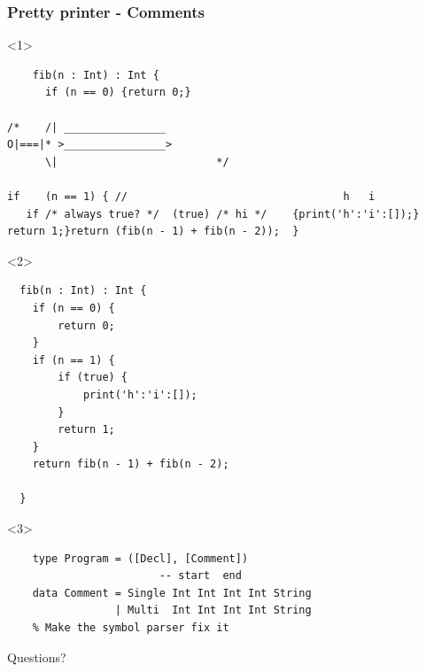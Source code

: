 \documentclass{beamer}
\begin{document}
\begin{frame}[fragile]
  \frametitle{Pretty printer - Comments}
    \begin{onlyenv}<1>
  \begin{verbatim}
    fib(n : Int) : Int {
      if (n == 0) {return 0;}
    
/*    /| ________________
O|===|* >________________>
      \|                         */

if    (n == 1) { //                                  h   i 
   if /* always true? */  (true) /* hi */    {print('h':'i':[]);}
return 1;}return (fib(n - 1) + fib(n - 2));  }
    \end{verbatim}
  \end{onlyenv}
\begin{onlyenv}<2>
  \begin{verbatim}
  fib(n : Int) : Int {
    if (n == 0) {
        return 0;
    }
    if (n == 1) {
        if (true) {
            print('h':'i':[]);
        }
        return 1;
    }
    return fib(n - 1) + fib(n - 2);

  }
    \end{verbatim}
  \end{onlyenv}

  \begin{onlyenv}<3>
  \begin{verbatim}
    type Program = ([Decl], [Comment])
                        -- start  end 
    data Comment = Single Int Int Int Int String
                 | Multi  Int Int Int Int String
    % Make the symbol parser fix it
  \end{verbatim}
  \end{onlyenv}

\end{frame}


\begin{frame}
  \begin{center}Questions?\end{center}
\end{frame}
\end{document}
